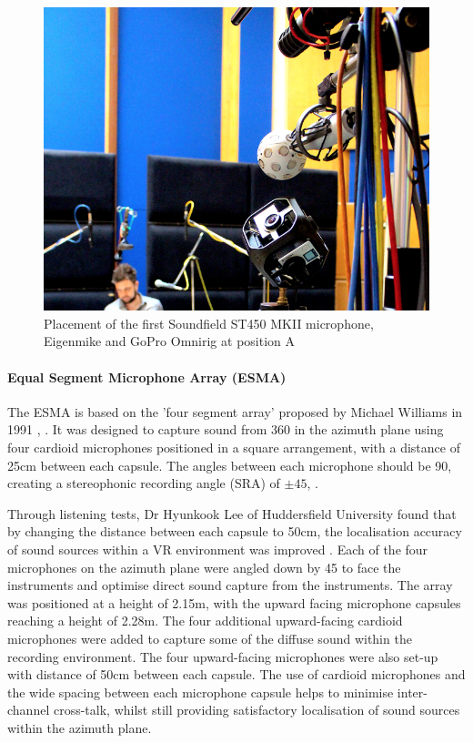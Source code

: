 			\begin{figure}[ht]
			\begin{center}
				\includegraphics[width = \linewidth]{images/other/ST450pos.png}
				\caption{Placement of the first Soundfield ST450 MKII microphone, Eigenmike and GoPro Omnirig at position A}
				\label{STApos}
			\end{center}
			\end{figure}

			\paragraph{Equal Segment Microphone Array (ESMA)}
			The ESMA is based on the 'four segment array' proposed by Michael Williams in 1991 \cite{williamsMMAD}, \cite{williams91}. It was designed to capture sound from 360\textdegree{} in the azimuth plane using four cardioid microphones positioned in a square arrangement, with a distance of 25cm between each capsule. The angles between each microphone should be 90\textdegree, creating a stereophonic recording angle (SRA) of $ \pm45 $\textdegree \cite{williamsMMAD}, \cite{williams91}. 

			Through listening tests, Dr Hyunkook Lee of Huddersfield University found that by changing the distance between each capsule to 50cm, the localisation accuracy of sound sources within a VR environment was improved \cite{esma}. Each of the four microphones on the azimuth plane were angled down by 45\textdegree{} to face the instruments and optimise direct sound capture from the instruments. The array was positioned at a height of 2.15m, with the upward facing microphone capsules reaching a height of 2.28m. The four additional upward-facing cardioid microphones were added to capture some of the diffuse sound within the recording environment. The four upward-facing microphones were also set-up with distance of 50cm between each capsule. The use of cardioid microphones and the wide spacing between each microphone capsule helps to minimise inter-channel cross-talk, whilst still providing satisfactory localisation of sound sources within the azimuth plane.\\


